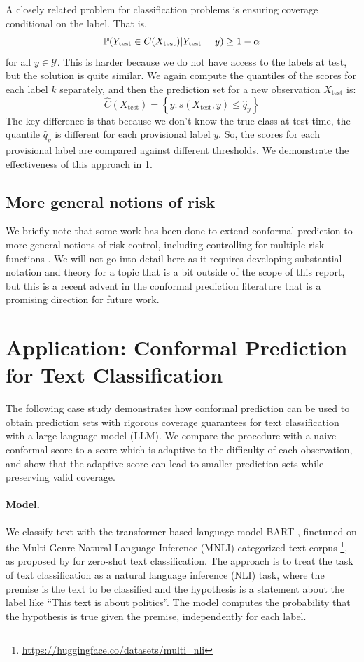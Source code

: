\documentclass[a4paper, 12pt]{article}
\begin{document}
A closely related problem for classification problems is ensuring coverage conditional on the label. That is,
\[ \P(Y_{\text{test}} \in C(X_{\text{test}}) | Y_{\text{test}} = y) \geq 1 - \alpha \]
for all $y \in \mathcal{Y}$. This is harder because we do not have access to the labels at test, but the solution is quite similar. We again compute the quantiles of the scores for each label $k$ separately, and then the prediction set for a new observation $X_{\text{test}}$ is:
\[ \hat{C}(X_{\text{test}}) = \left\{ y: s(X_{\text{test}}, y) \leq \hat{q}_{y} \right\} \]
The key difference is that because we don't know the true class at test time, the quantile $\hat{q}_y$ is different for each provisional label $y$. So, the scores for each provisional label are compared against different thresholds. We demonstrate the effectiveness of this approach in \ref*{sec:application}.

\subsection{More general notions of risk}
We briefly note that some work has been done to extend conformal prediction to more general notions of risk control, including controlling for multiple risk functions \autocite{angelopoulosLearnThenTest2022,batesDistributionfreeRiskcontrollingPrediction2021}. We will not go into detail here as it requires developing substantial notation and theory for a topic that is a bit outside of the scope of this report, but this is a recent advent in the conformal prediction literature that is a promising direction for future work.

\section{Application: Conformal Prediction for Text Classification}
\label{sec:application}
The following case study demonstrates how conformal prediction can be used to obtain prediction sets with rigorous coverage guarantees for text classification with a large language model (LLM). We compare the procedure with a naive conformal score to a score which is adaptive to the difficulty of each observation, and show that the adaptive score can lead to smaller prediction sets while preserving valid coverage.

\paragraph*{Model.} We classify text with the transformer-based language model BART \autocite{lewisBARTDenoisingSequencetoSequence2019},
finetuned on the Multi-Genre Natural Language Inference (MNLI) categorized text corpus \footnote{\url{https://huggingface.co/datasets/multi_nli}},
as proposed by \textcite{yinBenchmarkingZeroshotText2019} for zero-shot text classification. The approach is to treat the task of text classification as a natural language inference (NLI) task, where the premise is the text to be classified and the hypothesis is a statement about the label like ``This text is about politics''. The model computes the probability that the hypothesis is true given the premise, independently for each label.
\end{document}
